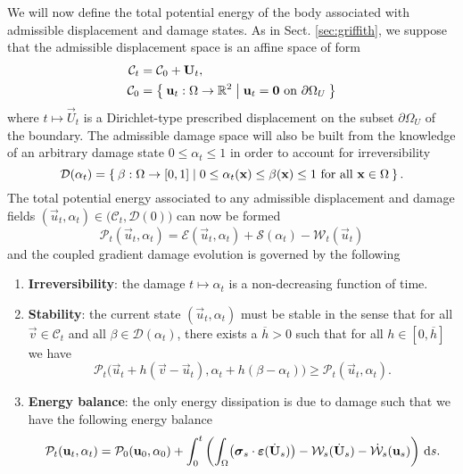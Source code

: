 We will now define the total potential energy of the body associated with admissible displacement and damage states. As in Sect. \ref{sec:griffith}, we suppose that the admissible displacement space is an affine space of form
\begin{equation} \label{eq:CtG}
\begin{aligned}
\mathcal{C}_t &= \mathcal{C}_0+\vec{U}_t, \\
\mathcal{C}_0 &= \set{\vec{u}_t:\Omega\to\mathbb{R}^2|\vec{u}_t=\vec{0}\text{ on }\partial\Omega_U}
\end{aligned}
\end{equation}
where $t\mapsto\vec{U}_t$ is a Dirichlet-type prescribed displacement on the subset $\partial\Omega_U$ of the boundary. The admissible damage space will also be built from the knowledge of an arbitrary damage state $0\leq\alpha_t\leq 1$ in order to account for irreversibility
\begin{equation} \label{eq:DtG}
\mathcal{D}(\alpha_t)=\set{\beta:\Omega\to[0,1]|0\leq\alpha_t(\vec{x})\leq\beta(\vec{x})\leq 1\text{ for all }\vec{x}\in\Omega}.
\end{equation}
The total potential energy associated to any admissible displacement and damage fields $(\vec{u}_t,\alpha_t)\in\bigl(\mathcal{C}_t,\mathcal{D}(0)\bigr)$ can now be formed
\[
\mathcal{P}_t(\vec{u}_t,\alpha_t)=\mathcal{E}(\vec{u}_t,\alpha_t)+\mathcal{S}(\alpha_t)-\mathcal{W}_t(\vec{u}_t)
\]
and the coupled gradient damage evolution is governed by the following

\begin{model} \label{model:qsgraddama}
\begin{enumerate}
\item \textbf{Irreversibility}: the damage $t\mapsto\alpha_t$ is a non-decreasing function of time.
\item \textbf{Stability}: the current state $(\vec{u}_t,\alpha_t)$ must be stable in the sense that for all $\vec{v}\in\mathcal{C}_t$ and all $\beta\in\mathcal{D}(\alpha_t)$, there exists a $\overline{h}>0$ such that for all $h\in[0,\overline{h}]$ we have
\begin{equation} \label{eq:qsstability}
\mathcal{P}_t\bigl(\vec{u}_t+h(\vec{v}-\vec{u}_t),\alpha_t+h(\beta-\alpha_t)\bigr)\geq\mathcal{P}_t(\vec{u}_t,\alpha_t).
\end{equation}
\item \textbf{Energy balance}: the only energy dissipation is due to damage such that we have the following energy balance
\begin{equation} \label{eq:qseb}
\mathcal{P}_t(\vec{u}_t,\alpha_t)=\mathcal{P}_0(\vec{u}_0,\alpha_0)+\int_0^t\left(\int_\Omega\bigl(\sig_s\cdot\eps(\dot{\vec{U}}_s)\bigr)-\mathcal{W}_s(\dot{\vec{U}}_s)-\dot{\mathcal{W}}_s(\vec{u}_s)\right)\D{s}.
\end{equation}
\end{enumerate}
\end{model}

